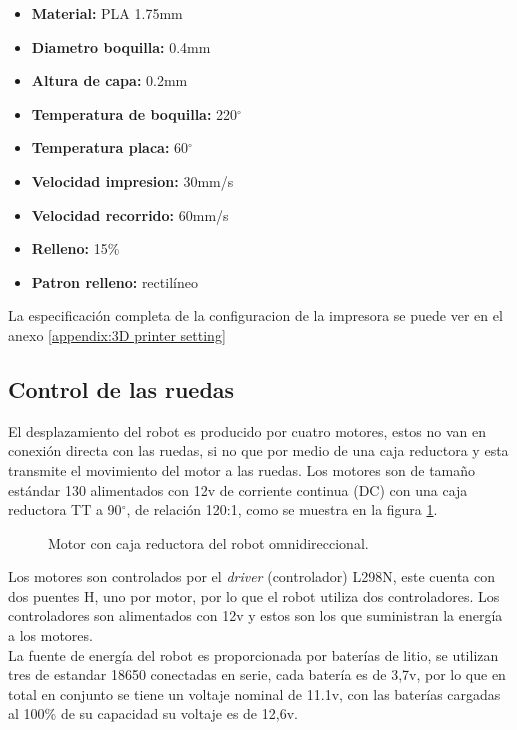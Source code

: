 \documentclass{iccmemoria}
\begin{document}
\begin{itemize}
	\item {\bf Material:} PLA 1.75mm
	\item {\bf Diametro boquilla:} 0.4mm
	\item {\bf Altura de capa:} 0.2mm
	\item {\bf Temperatura de boquilla:} 220$^{\circ}$
	\item {\bf Temperatura placa:} 60$^{\circ}$
	\item {\bf Velocidad impresion:} 30mm/s
	\item {\bf Velocidad recorrido:} 60mm/s
	\item {\bf Relleno:} 15\%
	\item {\bf Patron relleno:} rectilíneo
\end{itemize}

La especificación completa de la configuracion de la impresora se puede ver en el anexo \ref{appendix:3D printer setting}

\subsection{Control de las ruedas}

El desplazamiento del robot es producido por cuatro motores, estos no van en conexión directa con las ruedas, si no que por medio de una caja reductora y esta transmite el movimiento del motor a las ruedas. Los motores son de tamaño estándar 130 alimentados con 12v de corriente continua (DC) con una caja reductora TT a 90$^{\circ}$, de relación 120:1, como se muestra en la figura \ref{fig:motor}.\\

\begin{figure}[H]
  \centering
  
  \caption[Motor con caja reductora del robot omnidireccional.]{Motor con caja reductora del robot omnidireccional.}
  \label{fig:motor}
\end{figure}

Los motores son controlados por el \emph{driver} (controlador) L298N, este cuenta con dos puentes H, uno por motor, por lo que el robot utiliza dos controladores. Los controladores son alimentados con 12v y estos son los que suministran la energía a los motores.\\

La fuente de energía del robot es proporcionada por baterías de litio, se utilizan tres de estandar 18650 conectadas en serie, cada batería es de 3,7v, por lo que en total en conjunto se tiene un voltaje nominal de 11.1v, con las baterías cargadas al 100\% de su capacidad su voltaje es de 12,6v.\\
\end{document}
